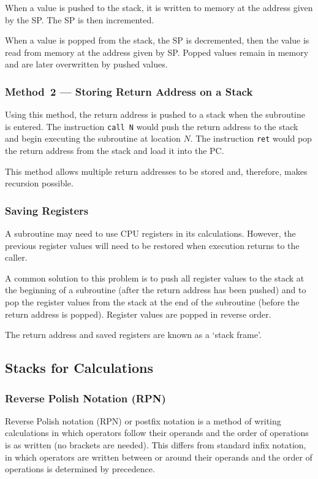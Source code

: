 When a value is pushed to the stack, it is written to memory at the address given by the SP.\@
The SP is then incremented.

When a value is popped from the stack, the SP is decremented, then the value is read from memory at the address given by SP.\@
Popped values remain in memory and are later overwritten by pushed values.

\subsubsection{Method~2 --- Storing Return Address on a Stack}

Using this method, the return address is pushed to a stack when the subroutine is entered.
The instruction \texttt{call N} would push the return address to the stack and begin executing the subroutine at location \( N \).
The instruction \texttt{ret} would pop the return address from the stack and load it into the PC.

This method allows multiple return addresses to be stored and, therefore, makes recursion possible.

\subsubsection{Saving Registers}

A subroutine may need to use CPU registers in its calculations.
However, the previous register values will need to be restored when execution returns to the caller.

A common solution to this problem is to push all register values to the stack at the beginning of a subroutine (after the return address has been pushed) and to pop the register values from the stack at the end of the subroutine (before the return address is popped).
Register values are popped in reverse order.

The return address and saved registers are known as a `stack frame'.

\subsection{Stacks for Calculations}

\subsubsection{Reverse Polish Notation (RPN)}

Reverse Polish notation (RPN) or postfix notation is a method of writing calculations in which operators follow their operands and the order of operations is as written (no brackets are needed).
This differs from standard infix notation, in which operators are written between or around their operands and the order of operations is determined by precedence.

